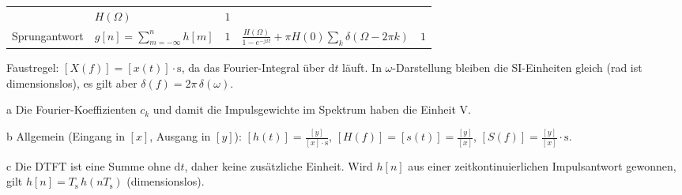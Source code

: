 \documentclass[a4paper,11pt]{article}
\begin{document}
\begin{table}[htbp]
\begin{threeparttable}
\begin{tabular}{@{}l l l l l@{}}
                              & $H(\Omega)$                                                                & $1$                                                                                      \\
            Sprungantwort
                              & $g[n] = \sum_{m=-\infty}^{n} h[m]$                                         & $1$
                              & $\frac{H(\Omega)}{1-e^{-j\Omega}} + \pi H(0)\sum_{k}\delta(\Omega-2\pi k)$ & $1$                                                                                      \\
            \bottomrule
        \end{tabular}
        \begin{tablenotes}\footnotesize
            \item[] Faustregel: $[X(f)] = [x(t)]\cdot\si{\second}$, da das Fourier-Integral über $\mathrm{d}t$ läuft.
            In $\omega$-Darstellung bleiben die SI-Einheiten gleich (rad ist dimensionslos), es gilt aber $\delta(f) = 2\pi\,\delta(\omega)$.
            \item[a] Die Fourier-Koeffizienten $c_k$ und damit die Impulsgewichte im Spektrum haben die Einheit \si{\volt}.
            \item[b] Allgemein (Eingang in $[x]$, Ausgang in $[y]$):
            $[h(t)] = \frac{[y]}{[x]\cdot\si{\second}}$, \quad $[H(f)] = [s(t)] = \frac{[y]}{[x]}$, \quad $[S(f)] = \frac{[y]}{[x]}\cdot\si{\second}$.
            \item[c] Die DTFT ist eine Summe ohne $\mathrm{d}t$, daher keine zusätzliche Einheit.
            Wird $h[n]$ aus einer zeitkontinuierlichen Impulsantwort gewonnen, gilt $h[n] = T_\mathrm{s}\, h(nT_\mathrm{s})$ (dimensionslos).
        \end{tablenotes}
    \end{threeparttable}
\end{table}
\end{document}
